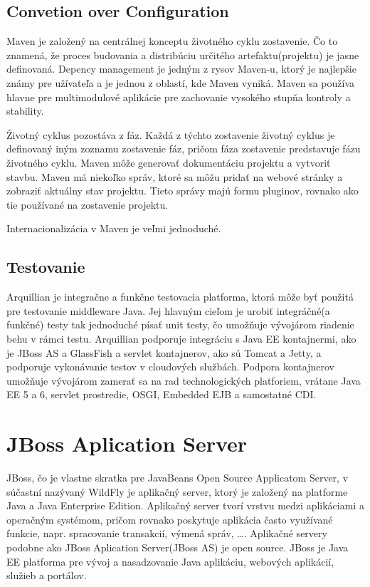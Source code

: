 \section{Convetion over Configuration}

Maven  je založený na centrálnej konceptu životného cyklu zostavenie. Čo to znamená, že proces budovania a distribúciu určitého artefaktu(projektu) je jasne definovaná. Depency management je jedným z rysov Maven-u, ktorý je najlepšie známy pre užívateľa a je jednou z oblastí, kde Maven vyniká. Maven sa používa hlavne pre multimodulové aplikácie pre zachovanie vysokého stupňa kontroly a stability.

Životný cyklus pozostáva z fáz. Každá z týchto zostavenie životný cyklus je definovaný iným zoznamu zostavenie fáz, pričom fáza zostavenie predstavuje fázu životného cyklu. Maven môže generovať dokumentáciu projektu a  vytvoriť stavbu. Maven má niekoľko správ, ktoré sa môžu pridať na webové stránky a zobraziť aktuálny stav projektu. Tieto správy majú formu pluginov, rovnako ako tie používané na zostavenie projektu.

Internacionalizácia v Maven je veľmi jednoduché.\cite{mavenbook}


\section{Testovanie}

Arquillian je integračne a funkčne testovacia platforma, ktorá môže byť použitá pre testovanie middleware Java. Jej hlavným cieľom je urobiť integráčné(a funkčné) testy tak jednoduché písať unit testy, čo umožňuje vývojárom riadenie behu v rámci testu. 
Arquillian podporuje integráciu s Java EE kontajnermi, ako je JBoss AS a GlassFish a servlet kontajnerov, ako sú Tomcat a Jetty, a podporuje vykonávanie testov v cloudových službách. Podpora kontajnerov umožňuje vývojárom zamerať sa na rad technologických platforiem, vrátane Java EE 5 a 6, servlet prostredie, OSGI, Embedded EJB a samostatné CDI.\cite{arqbook}


\chapter{JBoss Aplication Server} 
JBoss, čo je vlastne skratka pre JavaBeans Open Source Applicatom Server, v súčastní nazývaný WildFly je aplikačný server, ktorý je založený na platforme Java a Java Enterprise Edition.\cite{jbossbook} Aplikačný server tvorí vrstvu medzi aplikáciami a operačným systémom, pričom rovnako poskytuje aplikácia často využívané funkcie, napr. spracovanie transakcií, výmená správ, \ldots . Aplikačné servery podobne ako JBoss Aplication Server(JBoss AS) je open source. JBoss je Java EE platforma pre vývoj a nasadzovanie Java aplikáciu, webových aplikácií, služieb a portálov.

